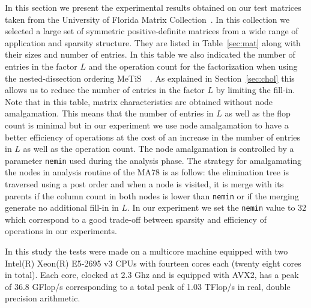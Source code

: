 \documentclass{article}
\newcommand{\alert}[1]{\textcolor{red}{#1}\xspace}
\newcommand{\TODO}[1]{\alert{TODO: #1}\xspace}
\newcommand{\metis}{{\sc Me$\!$T$\!$iS\ }}
\begin{document}
In this section we present the experimental results obtained on our
test matrices taken from the University of Florida Matrix
Collection~\cite{d.h:11}. In this collection we selected a large set
of symmetric positive-definite matrices from a wide range of
application and sparsity structure. They are listed in
Table~\ref{sec:mat} along with their sizes and number of entries. In this table we also indicated the number of entries in the factor $L$ and the
operation count for the factorization when using the nested-dissection
ordering \metis~\cite{k.k:98}. As explained in Section~\ref{sec:chol}
this allows us to reduce the number of entries in the factor $L$ by
limiting the fill-in. Note that in this table, matrix characteristics
are obtained without node amalgamation. This means that the number of
entries in $L$ as well as the flop count is minimal but in our
experiment we use node amalgamation to have a better efficiency of
operations at the cost of an increase in the number of entries in $L$
as well as the operation count. The node amalgamation is controlled by
a parameter \texttt{nemin} used during the analysis phase. The
strategy for amalgamating the nodes in analysis routine of the MA78 is
as follow: the elimination tree is traversed using a post order and
when a node is visited, it is merge with its parents if the column
count in both nodes is lower than \texttt{nemin} or if the merging
generate no additional fill-in in $L$. In our experiment we set the
\texttt{nemin} value to $32$ which correspond to a good trade-off
between sparsity and efficiency of operations in our experiments.

In this study the tests were made on a multicore machine equipped with
two Intel(R) Xeon(R) E5-2695 v3 CPUs with fourteen cores each (twenty
eight cores in total). Each core, clocked at 2.3 Ghz and is equipped
with AVX2, has a peak of 36.8 GFlop/s corresponding to a total peak of
1.03 TFlop/s in real, double precision arithmetic.


\end{document}
